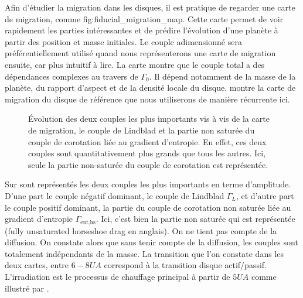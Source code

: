 Afin d'étudier la migration dans les disques, il est pratique de 
regarder une \og carte de migration\fg, comme 
{fig:fiducial_migration_map}. Cette carte permet de voir rapidement 
les parties intéressantes et de prédire l'évolution d'une planète à 
partir des position et masse initiales. Le couple adimensionné 
 sera préférentiellement utilisé quand 
nous représenterons une carte de migration ensuite, car plus intuitif 
à lire. La carte  montre que le couple 
total a des dépendances complexes au travers de $\Gamma_0$. Il 
dépend notamment de la masse de la planète, du rapport d'aspect et 
de la densité locale du disque.  montre la carte de migration du disque de référence que nous utiliserons de manière
récurrente ici. 

\begin{figure}[htbp]
\centering
{}\hfill
{}

\caption[Carte des couples de Linblad et corotation.]{Évolution des deux couples les plus importants vis à vis de la carte de
migration, le couple de Lindblad et la partie
non saturée du couple de corotation liée au gradient d'entropie. En effet, ces deux couples sont quantitativement plus grands que
tous les autres. Ici, seule la partie non-saturée du couple de corotation est représentée.}\label{fig:details_maps}
\end{figure}

Sur  sont représentés les deux couples les plus importants en terme d'amplitude. D'une part le couple négatif dominant, le
couple de Lindblad $\Gamma_L$, et d'autre part le couple positif dominant, la partie du couple de corotation non saturée liée au gradient d'entropie
$\Gamma_\text{ent,hs}$. Ici, c'est bien la partie non saturée qui est représentée (fully unsaturated horseshoe drag en anglais). On ne tient pas
compte de la diffusion. On constate alors que sans tenir compte de la diffusion, les couples sont totalement indépendants de la
masse. La transition que l'on constate dans les deux cartes, entre $6-8\unit{UA}$ correspond à la transition disque
actif/passif. L'irradiation est le processus de chauffage principal à partir de $5\unit{UA}$ comme illustré par
.

